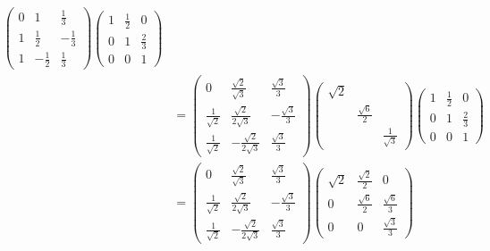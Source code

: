 \documentclass[12pt, a4paper, oneside, UTF8]{ctexbook}
\begin{document}
\begin{solution}
\begin{enumerate}[label=(\arabic*)]
\begin{align*}
\begin{pmatrix}
                0& 1 & \frac{1}{3}\\
                1& \frac{1}{2}& -\frac{1}{3} \\
                1 & -\frac{1}{2} & \frac{1}{3}
            \end{pmatrix} 
            \begin{pmatrix}
                1 &\frac{1}{2}&0\\
                0 & 1&\frac{2}{3} \\
                0&0&1
            \end{pmatrix}\\
            &=\begin{pmatrix}
                0& \frac{\sqrt{2}}{\sqrt{3}} & \frac{\sqrt{3}}{3}\\
                \frac{1}{\sqrt{2}}& \frac{\sqrt{2}}{2\sqrt{3}}& -\frac{\sqrt{3}}{3} \\
                \frac{1}{\sqrt{2}} & -\frac{\sqrt{2}}{2\sqrt{3}}& \frac{\sqrt{3}}{3}
            \end{pmatrix}
            \begin{pmatrix}
                \sqrt{2} & & \\
                & \frac{\sqrt{6}}{2}& \\
                & & \frac{1}{\sqrt{3}}
            \end{pmatrix}
            \begin{pmatrix}
                1 &\frac{1}{2}&0\\
                0 & 1&\frac{2}{3} \\
                0&0&1
            \end{pmatrix}\\
            &=\begin{pmatrix}
                0& \frac{\sqrt{2}}{\sqrt{3}} & \frac{\sqrt{3}}{3}\\
                \frac{1}{\sqrt{2}}& \frac{\sqrt{2}}{2\sqrt{3}}& -\frac{\sqrt{3}}{3} \\
                \frac{1}{\sqrt{2}} & -\frac{\sqrt{2}}{2\sqrt{3}}& \frac{\sqrt{3}}{3}
            \end{pmatrix}
            \begin{pmatrix}
                \sqrt{2} &\frac{\sqrt{2}}{2}&0\\
                0 & \frac{\sqrt{6}}{2}&\frac{\sqrt{6}}{3} \\
                0&0&\frac{\sqrt{3}}{3}
            \end{pmatrix}
        \end{align*}

\end{enumerate}
\end{solution}
\end{document}
